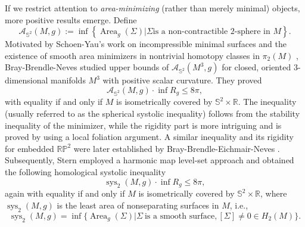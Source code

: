 \documentclass[11pt]{amsart}
\theoremstyle{definition}
\theoremstyle{remark}
\numberwithin{equation}{section}
\begin{document}
If we restrict attention to \textit{area-minimizing} (rather than merely minimal) objects, more
  positive results emerge.  Define
\begin{equation*}
    \mathcal{A}_{\mathbb{S}^2}(M, g) := \inf \left\{ \operatorname{Area}_g(\Sigma) | \Sigma  \text{
      is a non-contractible $2$-sphere in } M \right\}.
\end{equation*}
Motivated by Schoen-Yau's work on incompressible minimal surfaces
  \cite{Schoen-Yau-incompressible-minimal-surfaces} and the existence of smooth area minimizers in 
  nontrivial homotopy classes in $\pi_2(M)$ \cite{meeks-yau-existence}, Bray-Brendle-Neves
  \cite{BrayBrenleNevesrigidity} studied upper bounds of $\mathcal{A}_{\mathbb{S}^2}(M^3, g)$ for
  closed, oriented $3$-dimensional manifolds $M^3$ with positive scalar curvature. They proved
\[\mathcal{A}_{\mathbb{S}^2}(M, g)\cdot \inf R_g\leq 8\pi,\]
with equality if and only if $M$ is isometrically covered by $\mathbb{S}^2\times \mathbb{R}.$ The
  inequality (usually referred to as the spherical systolic inequality) follows from the stability
  inequality of the minimizer, while the rigidity part is more intriguing and is proved by using a
  local foliation argument.  A similar inequality and its rigidity for embedded
  $\mathbb{RP}^{2}$ were later established by Bray-Brendle-Eichmair-Neves
  \cite{bray-brendle-eichmair-neves}. 
Subsequently, Stern \cite{stern-scalar-curvature-harmonic-maps} employed a harmonic map level-set
  approach and obtained the following homological systolic inequality
\[\operatorname{sys}_2(M,g)\cdot \inf R_g\leq 8\pi,\]
again with equality if and only if $M$ is isometrically covered by $\mathbb{S}^2\times \mathbb{R}$,
  where $\operatorname{sys}_2(M,g)$ is the least area of nonseparating surfaces in $M$, i.e.,
\[\operatorname{sys}_2(M,g)=\inf\{\operatorname{Area}_g(\Sigma)|\Sigma\ \text{is a smooth surface},
  [\Sigma]\neq 0\in H_2(M)\}.\] 
\end{document}
